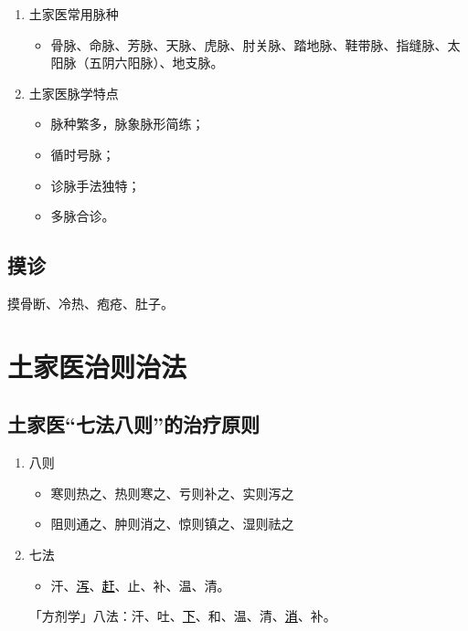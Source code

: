 \documentclass[cn,black,12pt,normal,founder]{elegantnote}
\newcommand{\redt}[1]{\textcolor{black}{{}#1}}      %
\begin{document}
\begin{enumerate}
  \item 土家医常用脉种
  \begin{itemize}
    \item 骨脉、命脉、芳脉、天脉、虎脉、肘关脉、踏地脉、鞋带脉、指缝脉、太阳脉（五阴六阳脉）、地支脉。
  \end{itemize}
  \item 土家医脉学特点
  \begin{itemize}
    \item 脉种繁多，脉象脉形简练；
    \item 循时号脉；
    \item 诊脉手法独特；
    \item 多脉合诊。
  \end{itemize}
\end{enumerate}

\subsection{摸诊}

摸骨断、冷热、疱疮、肚子。

\section{土家医治则治法}

\subsection{土家医“七法八则”的治疗原则}

\begin{enumerate}
  \item 八则
  \begin{itemize}
    \item 寒则热之、热则寒之、亏则补之、实则泻之
    \item 阻则通之、肿则消之、惊则镇之、湿则祛之
  \end{itemize}
  \item 七法
  \begin{itemize}
    \item 汗、\redt{\uline{泻}}、\redt{\uline{赶}}、止、补、温、清。
  \end{itemize}
  \begin{note}
  「方剂学」八法：汗、吐、\redt{\uline{下}}、和、温、清、\redt{\uline{消}}、补。
  \end{note}
\end{enumerate}
\end{document}
